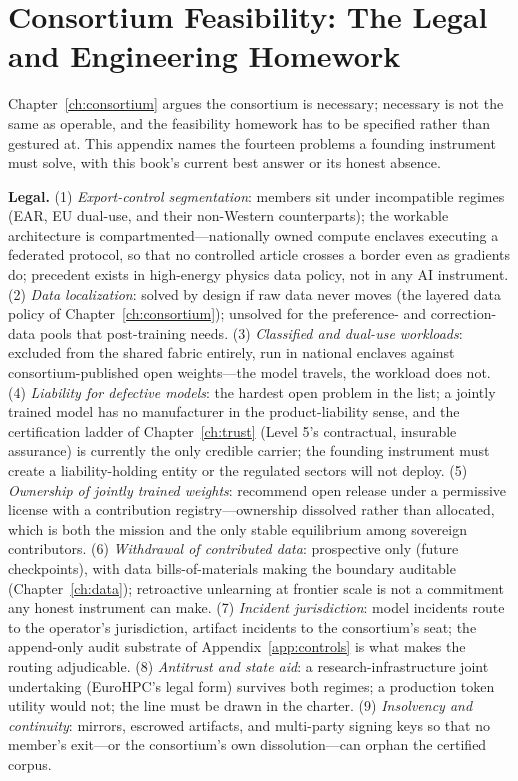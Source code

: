 \chapter{Consortium Feasibility: The Legal and Engineering Homework}
\label{app:consortium-feasibility}

Chapter~\ref{ch:consortium} argues the consortium is necessary; necessary is not the same as operable, and the feasibility homework has to be specified rather than gestured at. This appendix names the fourteen problems a founding instrument must solve, with this book's current best answer or its honest absence.

\textbf{Legal.} (1) \emph{Export-control segmentation}: members sit under incompatible regimes (EAR, EU dual-use, and their non-Western counterparts); the workable architecture is compartmented---nationally owned compute enclaves executing a federated protocol, so that no controlled article crosses a border even as gradients do; precedent exists in high-energy physics data policy, not in any AI instrument. (2) \emph{Data localization}: solved by design if raw data never moves (the layered data policy of Chapter~\ref{ch:consortium}); unsolved for the preference- and correction-data pools that post-training needs. (3) \emph{Classified and dual-use workloads}: excluded from the shared fabric entirely, run in national enclaves against consortium-published open weights---the model travels, the workload does not. (4) \emph{Liability for defective models}: the hardest open problem in the list; a jointly trained model has no manufacturer in the product-liability sense, and the certification ladder of Chapter~\ref{ch:trust} (Level 5's contractual, insurable assurance) is currently the only credible carrier; the founding instrument must create a liability-holding entity or the regulated sectors will not deploy. (5) \emph{Ownership of jointly trained weights}: recommend open release under a permissive license with a contribution registry---ownership dissolved rather than allocated, which is both the mission and the only stable equilibrium among sovereign contributors. (6) \emph{Withdrawal of contributed data}: prospective only (future checkpoints), with data bills-of-materials making the boundary auditable (Chapter~\ref{ch:data}); retroactive unlearning at frontier scale is not a commitment any honest instrument can make. (7) \emph{Incident jurisdiction}: model incidents route to the operator's jurisdiction, artifact incidents to the consortium's seat; the append-only audit substrate of Appendix~\ref{app:controls} is what makes the routing adjudicable. (8) \emph{Antitrust and state aid}: a research-infrastructure joint undertaking (EuroHPC's legal form) survives both regimes; a production token utility would not; the line must be drawn in the charter. (9) \emph{Insolvency and continuity}: mirrors, escrowed artifacts, and multi-party signing keys so that no member's exit---or the consortium's own dissolution---can orphan the certified corpus.

